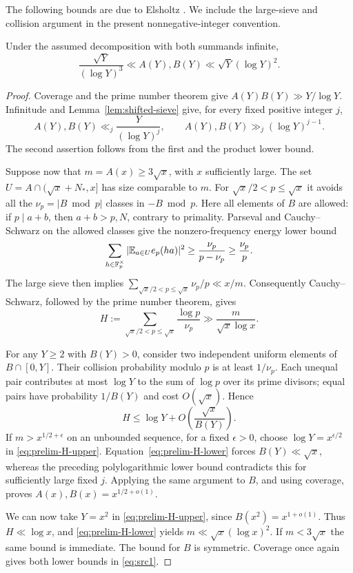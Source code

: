 The following bounds are due to Elsholtz
\cite[Theorem~1.9]{Elsholtz2006}.  We include the large-sieve and
collision argument in the present nonnegative-integer convention.

\begin{lemma}\label{lem:size}
Under the assumed decomposition with both summands infinite,
\begin{equation}\label{eq:src1}
 \frac{\sqrt Y}{(\log Y)^3}\ll A(Y),B(Y)
 \ll \sqrt Y(\log Y)^2.
\end{equation}
\end{lemma}

\begin{proof}
Coverage and the prime number theorem give
$A(Y)B(Y)\gg Y/\log Y$. Infinitude and
Lemma~\ref{lem:shifted-sieve} give, for every fixed positive integer $j$,
\[
 A(Y),B(Y)\ll_j\frac{Y}{(\log Y)^j},
 \qquad A(Y),B(Y)\gg_j(\log Y)^{j-1}.
\]
The second assertion follows from the first and the product lower bound.

Suppose now that $m=A(x)\ge3\sqrt x$, with $x$ sufficiently large.
The set $U=A\cap(\sqrt x+N_*,x]$ has size comparable to $m$.
For $\sqrt x/2<p\le\sqrt x$ it avoids all the
$\nu_p=|B\bmod p|$ classes in $-B\bmod p$. Here all elements of $B$
are allowed: if $p\mid a+b$, then $a+b>p,N$, contrary to primality.
Parseval and Cauchy--Schwarz on the allowed classes give the
nonzero-frequency energy lower bound
\[
 \sum_{h\in\mathbb F_p^\times}|\mathbb E_{a\in U}e_p(ha)|^2
 \ge \frac{\nu_p}{p-\nu_p}\ge\frac{\nu_p}{p}.
\]
The large sieve then implies
$\sum_{\sqrt x/2<p\le\sqrt x}\nu_p/p\ll x/m$.
Consequently Cauchy--Schwarz, followed by the prime number theorem,
gives
\begin{equation}\label{eq:prelim-H-lower}
 H:=\sum_{\sqrt x/2<p\le\sqrt x}\frac{\log p}{\nu_p}
 \gg \frac{m}{\sqrt x\log x}.
\end{equation}

For any $Y\ge2$ with $B(Y)>0$, consider two independent uniform
elements of $B\cap[0,Y]$. Their collision probability modulo $p$ is
at least $1/\nu_p$. Each unequal pair contributes at most $\log Y$
to the sum of $\log p$ over its prime divisors; equal pairs have
probability $1/B(Y)$ and cost $O(\sqrt x)$. Hence
\begin{equation}\label{eq:prelim-H-upper}
 H\le\log Y+O\left(\frac{\sqrt x}{B(Y)}\right).
\end{equation}
If $m>x^{1/2+\epsilon}$ on an unbounded sequence, for a fixed
$\epsilon>0$, choose $\log Y=x^{\epsilon/2}$ in
\eqref{eq:prelim-H-upper}. Equation~\eqref{eq:prelim-H-lower} forces
$B(Y)\ll\sqrt x$, whereas the preceding polylogarithmic lower bound
contradicts this for sufficiently large fixed $j$. Applying the same
argument to $B$, and using coverage, proves
$A(x),B(x)=x^{1/2+o(1)}$.

We can now take $Y=x^2$ in \eqref{eq:prelim-H-upper}, since
$B(x^2)=x^{1+o(1)}$. Thus $H\ll\log x$, and
\eqref{eq:prelim-H-lower} yields
$m\ll\sqrt x(\log x)^2$. If $m<3\sqrt x$ the same bound is immediate.
The bound for $B$ is symmetric. Coverage once again gives both lower
bounds in \eqref{eq:src1}.
\end{proof}

